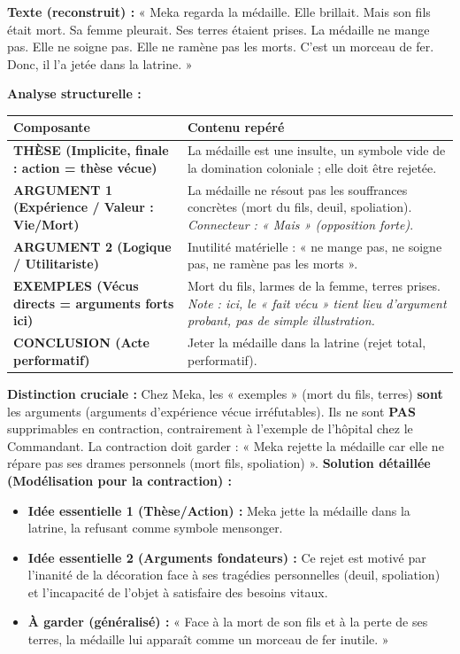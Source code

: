 \documentclass[11pt]{article}
\begin{document}
\begin{exoresolu}
\textbf{Texte (reconstruit) :} « Meka regarda la médaille. Elle brillait. Mais son fils était mort. Sa femme pleurait. Ses terres étaient prises. La médaille ne mange pas. Elle ne soigne pas. Elle ne ramène pas les morts. C'est un morceau de fer. Donc, il l'a jetée dans la latrine. »

\textbf{Analyse structurelle :}

\begin{center}
\begin{tabularx}{\linewidth}{|l|X|}\hline
\rowcolor{popblueL}
\textbf{Composante} & \textbf{Contenu repéré} \\ \hline
\textbf{THÈSE (Implicite, finale : action = thèse vécue)} & La médaille est une insulte, un symbole vide de la domination coloniale ; elle doit être rejetée. \\ \hline
\textbf{ARGUMENT 1 (Expérience / Valeur : Vie/Mort)} & La médaille ne résout pas les souffrances concrètes (mort du fils, deuil, spoliation). \textit{Connecteur : « Mais » (opposition forte)}. \\ \hline
\textbf{ARGUMENT 2 (Logique / Utilitariste)} & Inutilité matérielle : « ne mange pas, ne soigne pas, ne ramène pas les morts ». \\ \hline
\textbf{EXEMPLES (Vécus directs = arguments forts ici)} & Mort du fils, larmes de la femme, terres prises. \textit{Note : ici, le « fait vécu » tient lieu d'argument probant, pas de simple illustration.} \\ \hline
\textbf{CONCLUSION (Acte performatif)} & Jeter la médaille dans la latrine (rejet total, performatif). \\ \hline
\end{tabularx}
\end{center}

\textbf{Distinction cruciale :} Chez Meka, les « exemples » (mort du fils, terres) \textbf{sont} les arguments (arguments d'expérience vécue irréfutables). Ils ne sont \textbf{PAS} supprimables en contraction, contrairement à l'exemple de l'hôpital chez le Commandant. La contraction doit garder : « Meka rejette la médaille car elle ne répare pas ses drames personnels (mort fils, spoliation) ».
\tcblower
\textbf{Solution détaillée (Modélisation pour la contraction) :}
\begin{itemize}
    \item \textbf{Idée essentielle 1 (Thèse/Action) :} Meka jette la médaille dans la latrine, la refusant comme symbole mensonger.
    \item \textbf{Idée essentielle 2 (Arguments fondateurs) :} Ce rejet est motivé par l'inanité de la décoration face à ses tragédies personnelles (deuil, spoliation) et l'incapacité de l'objet à satisfaire des besoins vitaux.
    \item \textbf{À garder (généralisé) :} « Face à la mort de son fils et à la perte de ses terres, la médaille lui apparaît comme un morceau de fer inutile. »
\end{itemize}
\end{exoresolu}
\end{document}
